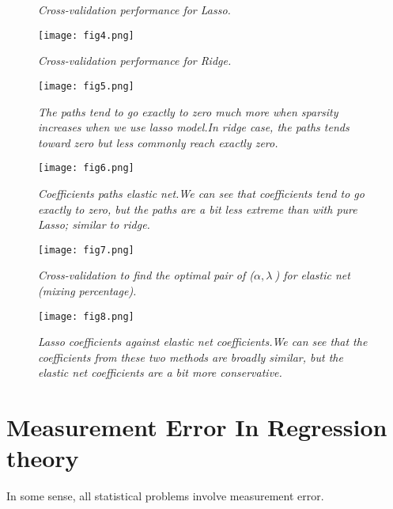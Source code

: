 \documentclass[12pt]{report}
\begin{document}
\begin{itemize}
\begin{figure}
\begin{minipage}[c]{0.49\textwidth}
			\caption{\textit{Cross-validation performance for Lasso.}}
		\end{minipage}
		\hfill
		\begin{minipage}[c]{0.49\textwidth}
			\centering
			\texttt{[image: fig4.png]}
			\caption{\textit{Cross-validation performance for Ridge.}}
		\end{minipage}
	\end{figure}
	\begin{figure}
		\begin{minipage}[c]{0.49\textwidth}
			\centering
			\texttt{[image: fig5.png]}
			
			\caption[Ridge versus Lasso coefficients paths]{\textit{The paths tend to go exactly to zero much more when sparsity increases when we use lasso model.In ridge case, the paths tends toward zero but less commonly reach exactly zero.}}
		\end{minipage}
		\hfill
		\begin{minipage}[c]{0.49\textwidth}
			\centering
			\texttt{[image: fig6.png]}
			\caption[Coefficients paths elastic net]{\textit{Coefficients paths elastic net.We can see that coefficients tend to go exactly to zero, but the paths are a bit less extreme than with pure Lasso; similar to ridge.}}
		\end{minipage}
	\end{figure}
	\begin{figure}
		\begin{minipage}[c]{0.49\textwidth}
			\centering
			\texttt{[image: fig7.png]}
			
			\caption[Cross-validation for elastic net regression]{\textit{Cross-validation to find the optimal pair of ($\alpha,\lambda\ $) for elastic net (mixing percentage).}}
		\end{minipage}
		\hfill
		\begin{minipage}[c]{0.49\textwidth}
			\centering
			\texttt{[image: fig8.png]}
			\caption[Lasso coefficients against elastic net coefficients]{\textit{Lasso coefficients against elastic net coefficients.We can see that the coefficients from these two methods are broadly similar, but the elastic net coefficients are a bit more conservative.}}
		\end{minipage}
	\end{figure}
\end{itemize}
\section{Measurement Error In Regression theory }
In some sense, all statistical problems involve measurement error.
\end{document}
